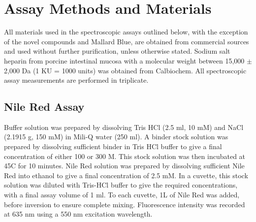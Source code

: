 \newpage
\section{Assay Methods and Materials}
All materials used in the spectroscopic assays outlined below, with the exception of the novel compounds and Mallard Blue, are obtained from commercial sources and used without further purification, unless otherwise stated.  
\newline
Sodium salt heparin from porcine intestinal mucosa with a molecular weight between 15,000 $\pm$ 2,000 Da (1 KU = 1000 units) was obtained from Calbiochem.
\newline
All spectroscopic assay measurements are performed in triplicate. 

\subsection*{Nile Red Assay}
Buffer solution was prepared by dissolving Tris HCl (2.5 ml, 10 mM) and NaCl (2.1915 g, 150 mM) in Mili-Q water  (250 ml).
\newline
A binder stock solution was prepared by dissolving sufficient binder in Tris HCl buffer to give a final concentration of either 100 or 300 \textmu M. This stock solution was then incubated at 45\textdegree C for 10 minutes. 
\newline
Nile Red solution was prepared by dissolving sufficient Nile Red into ethanol to give a final concentration of 2.5 mM.
\newline
In a cuvette, this stock solution was diluted with Tris-HCl buffer to give the required concentrations, with a final assay volume of 1 ml. 
\newline
To each cuvette, 1\textmu L of Nile Red was added, before inversion to ensure complete mixing. Fluorescence intensity was recorded at 635 nm using a 550 nm excitation wavelength. 
